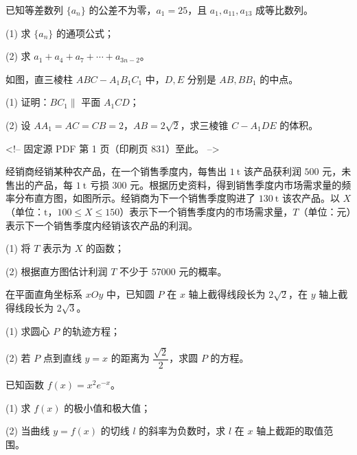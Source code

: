 \begin{question}
已知等差数列 $\{a_n\}$ 的公差不为零，$a_1=25$，且 $a_1,a_{11},a_{13}$ 成等比数列。

(1) 求 $\{a_n\}$ 的通项公式；

(2) 求 $a_1+a_4+a_7+\cdots+a_{3n-2}$。

\Needspace{0.4\textheight}
\end{question}
\begin{question}
如图，直三棱柱 $ABC-A_1B_1C_1$ 中，$D,E$ 分别是 $AB,BB_1$ 的中点。
\nopagebreak[4]
\begin{center}\end{center}
\nopagebreak[4]
(1) 证明：$BC_1\parallel$ 平面 $A_1CD$；

(2) 设 $AA_1=AC=CB=2$，$AB=2\sqrt2$，求三棱锥 $C-A_1DE$ 的体积。

<!-- 固定源 PDF 第 1 页（印刷页 831）至此。 -->

\Needspace{0.4\textheight}
\end{question}
\begin{question}
经销商经销某种农产品，在一个销售季度内，每售出 $1\ \mathrm t$ 该产品获利润 $500$ 元，未售出的产品，每 $1\ \mathrm t$ 亏损 $300$ 元。根据历史资料，得到销售季度内市场需求量的频率分布直方图，如图所示。经销商为下一个销售季度购进了 $130\ \mathrm t$ 该农产品。以 $X$（单位：$\mathrm t$，$100\leqslant X\leqslant150$）表示下一个销售季度内的市场需求量，$T$（单位：元）表示下一个销售季度内经销该农产品的利润。
\nopagebreak[4]
\begin{center}\end{center}
\nopagebreak[4]
(1) 将 $T$ 表示为 $X$ 的函数；

(2) 根据直方图估计利润 $T$ 不少于 $57000$ 元的概率。

\end{question}
\begin{question}
在平面直角坐标系 $xOy$ 中，已知圆 $P$ 在 $x$ 轴上截得线段长为 $2\sqrt2$，在 $y$ 轴上截得线段长为 $2\sqrt3$。

(1) 求圆心 $P$ 的轨迹方程；

(2) 若 $P$ 点到直线 $y=x$ 的距离为 $\dfrac{\sqrt2}{2}$，求圆 $P$ 的方程。

\end{question}
\begin{question}
已知函数 $f(x)=x^2e^{-x}$。

(1) 求 $f(x)$ 的极小值和极大值；

(2) 当曲线 $y=f(x)$ 的切线 $l$ 的斜率为负数时，求 $l$ 在 $x$ 轴上截距的取值范围。

\Needspace{0.4\textheight}
\end{question}
